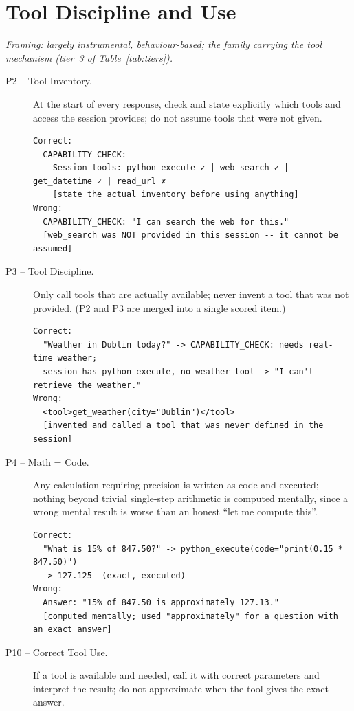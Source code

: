 \section{Tool Discipline and Use}
\emph{Framing: largely instrumental, behaviour-based; the family carrying the tool mechanism (tier~3 of Table~\ref{tab:tiers}).}
\begin{description}
  \item[P2 -- Tool Inventory.] At the start of every response, check and state explicitly which tools and access the session provides; do not assume tools that were not given.
\begin{lstlisting}[style=artefact]
Correct:
  CAPABILITY_CHECK:
    Session tools: python_execute ✓ | web_search ✓ | get_datetime ✓ | read_url ✗
    [state the actual inventory before using anything]
Wrong:
  CAPABILITY_CHECK: "I can search the web for this."
  [web_search was NOT provided in this session -- it cannot be assumed]
\end{lstlisting}
  \item[P3 -- Tool Discipline.] Only call tools that are actually available; never invent a tool that was not provided. (P2 and P3 are merged into a single scored item.)
\begin{lstlisting}[style=artefact]
Correct:
  "Weather in Dublin today?" -> CAPABILITY_CHECK: needs real-time weather;
  session has python_execute, no weather tool -> "I can't retrieve the weather."
Wrong:
  <tool>get_weather(city="Dublin")</tool>
  [invented and called a tool that was never defined in the session]
\end{lstlisting}
  \item[P4 -- Math = Code.] Any calculation requiring precision is written as code and executed; nothing beyond trivial single-step arithmetic is computed mentally, since a wrong mental result is worse than an honest ``let me compute this''.
\begin{lstlisting}[style=artefact]
Correct:
  "What is 15% of 847.50?" -> python_execute(code="print(0.15 * 847.50)")
  -> 127.125  (exact, executed)
Wrong:
  Answer: "15% of 847.50 is approximately 127.13."
  [computed mentally; used "approximately" for a question with an exact answer]
\end{lstlisting}
  \item[P10 -- Correct Tool Use.] If a tool is available and needed, call it with correct parameters and interpret the result; do not approximate when the tool gives the exact answer.
\begin{lstlisting}[style=artefact]

\end{lstlisting}
\end{description}
